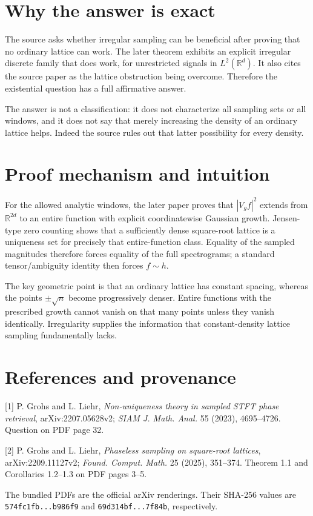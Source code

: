 \documentclass[11pt]{article}
\newcommand{\R}{\mathbb R}
\begin{document}
\section*{Why the answer is exact}

The source asks whether irregular sampling can be beneficial after proving
that no ordinary lattice can work.  The later theorem exhibits an explicit
irregular discrete family that does work, for unrestricted signals in
$L^2(\R^d)$.  It also cites the source paper as the lattice obstruction being
overcome.  Therefore the existential question has a full affirmative answer.

The answer is not a classification: it does not characterize all sampling
sets or all windows, and it does not say that merely increasing the density
of an ordinary lattice helps.  Indeed the source rules out that latter
possibility for every density.

\section*{Proof mechanism and intuition}

For the allowed analytic windows, the later paper proves that
$|V_gf|^2$ extends from $\R^{2d}$ to an entire function with explicit
coordinatewise Gaussian growth.  Jensen-type zero counting shows that a
sufficiently dense square-root lattice is a uniqueness set for precisely
that entire-function class.  Equality of the sampled magnitudes therefore
forces equality of the full spectrograms; a standard tensor/ambiguity
identity then forces $f\sim h$.

The key geometric point is that an ordinary lattice has constant spacing,
whereas the points $\pm\sqrt n$ become progressively denser.  Entire
functions with the prescribed growth cannot vanish on that many points
unless they vanish identically.  Irregularity supplies the information that
constant-density lattice sampling fundamentally lacks.

\section*{References and provenance}

[1] P. Grohs and L. Liehr, \emph{Non-uniqueness theory in sampled STFT
phase retrieval}, arXiv:2207.05628v2; \emph{SIAM J. Math. Anal.} 55 (2023),
4695--4726.  Question on PDF page 32.

[2] P. Grohs and L. Liehr, \emph{Phaseless sampling on square-root
lattices}, arXiv:2209.11127v2; \emph{Found. Comput. Math.} 25 (2025),
351--374.  Theorem 1.1 and Corollaries 1.2--1.3 on PDF pages 3--5.

The bundled PDFs are the official arXiv renderings.  Their SHA-256 values are
\texttt{574fc1fb...b986f9} and \texttt{69d314bf...7f84b}, respectively.
\end{document}
